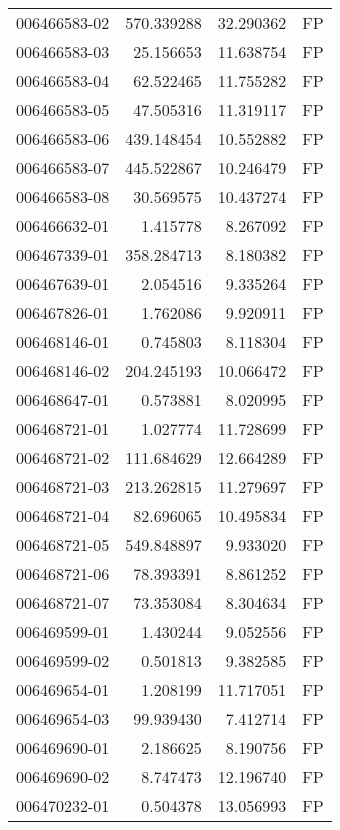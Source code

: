 \begin{tabular}{lrrl}
006466583-02 &  570.339288 &      32.290362 &   FP \\
006466583-03 &   25.156653 &      11.638754 &   FP \\
006466583-04 &   62.522465 &      11.755282 &   FP \\
006466583-05 &   47.505316 &      11.319117 &   FP \\
006466583-06 &  439.148454 &      10.552882 &   FP \\
006466583-07 &  445.522867 &      10.246479 &   FP \\
006466583-08 &   30.569575 &      10.437274 &   FP \\
006466632-01 &    1.415778 &       8.267092 &   FP \\
006467339-01 &  358.284713 &       8.180382 &   FP \\
006467639-01 &    2.054516 &       9.335264 &   FP \\
006467826-01 &    1.762086 &       9.920911 &   FP \\
006468146-01 &    0.745803 &       8.118304 &   FP \\
006468146-02 &  204.245193 &      10.066472 &   FP \\
006468647-01 &    0.573881 &       8.020995 &   FP \\
006468721-01 &    1.027774 &      11.728699 &   FP \\
006468721-02 &  111.684629 &      12.664289 &   FP \\
006468721-03 &  213.262815 &      11.279697 &   FP \\
006468721-04 &   82.696065 &      10.495834 &   FP \\
006468721-05 &  549.848897 &       9.933020 &   FP \\
006468721-06 &   78.393391 &       8.861252 &   FP \\
006468721-07 &   73.353084 &       8.304634 &   FP \\
006469599-01 &    1.430244 &       9.052556 &   FP \\
006469599-02 &    0.501813 &       9.382585 &   FP \\
006469654-01 &    1.208199 &      11.717051 &   FP \\
006469654-03 &   99.939430 &       7.412714 &   FP \\
006469690-01 &    2.186625 &       8.190756 &   FP \\
006469690-02 &    8.747473 &      12.196740 &   FP \\
006470232-01 &    0.504378 &      13.056993 &   FP \\

\end{tabular}
